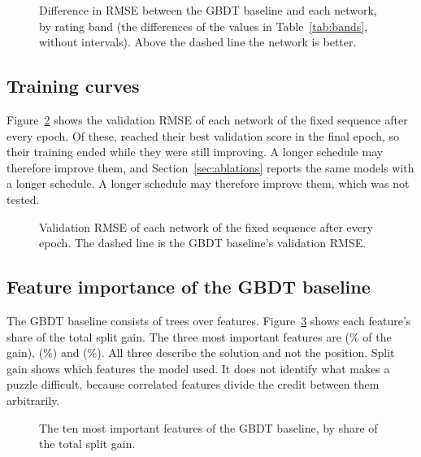 \documentclass[11pt]{article}
\begin{document}
\begin{figure}[htbp]\centering
{}
\caption{Difference in RMSE between the GBDT baseline and each network, by
rating band (the differences of the values in Table~\ref{tab:bands}, without
intervals). Above the dashed line the network is better.}
\label{fig:bands}
\end{figure}

\subsection{Training curves}

Figure~\ref{fig:curves} shows the validation RMSE of each network of the
fixed sequence after every epoch. Of these, 
reached their best validation score in the final epoch, so their training
ended while they were still improving.
\ifvariants
A longer schedule may therefore improve them, and
Section~\ref{sec:ablations} reports the same models with a longer schedule.
\else
A longer schedule may therefore improve them, which was not tested.
\fi

\begin{figure}[htbp]\centering
{}
\caption{Validation RMSE of each network of the fixed sequence after every
epoch. The dashed line is the GBDT baseline's validation RMSE.}
\label{fig:curves}
\end{figure}

\subsection{Feature importance of the GBDT baseline}

The GBDT baseline consists of  trees over
 features. Figure~\ref{fig:leans} shows each feature's
share of the total split gain. The three most important features are
 (\% of the gain),
 (\%) and
 (\%). All three
describe the solution and not the position. Split gain shows which features
the model used. It does not identify what makes a puzzle difficult, because
correlated features divide the credit between them arbitrarily.

\begin{figure}[htbp]\centering
{}
\caption{The ten most important features of the GBDT baseline, by share of
the total split gain.}
\label{fig:leans}
\end{figure}
\end{document}
